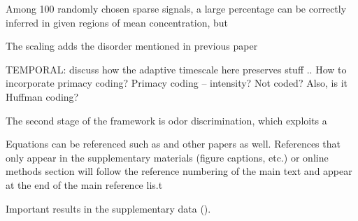 Among 100 randomly chosen sparse signals, a large percentage can be correctly inferred in given regions of mean concentration, but 







The scaling adds the disorder mentioned in previous paper

TEMPORAL: discuss how the adaptive timescale here preserves stuff .. How to incorporate primacy coding?
Primacy coding -- intensity? Not coded? Also, is it Huffman coding?

The second stage of the framework is odor discrimination, which exploits a 



Equations can be referenced such as  and other papers as well. References
that only appear in the supplementary materials (figure captions, etc.) or online methods section
will follow the reference numbering of the main text and appear at the end of the main reference
lis.t

Important results in the supplementary data ().
